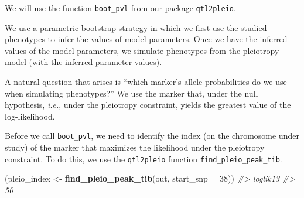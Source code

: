 \documentclass[oneside]{book}\usepackage[]{graphicx}\usepackage[]{color}
\newenvironment{Shaded}{\begin{snugshade}}{\end{snugshade}}
\newcommand{\CommentTok}[1]{\textcolor[rgb]{0.56,0.35,0.01}{\textit{#1}}}
\newcommand{\DataTypeTok}[1]{\textcolor[rgb]{0.13,0.29,0.53}{#1}}
\newcommand{\DecValTok}[1]{\textcolor[rgb]{0.00,0.00,0.81}{#1}}
\newcommand{\KeywordTok}[1]{\textcolor[rgb]{0.13,0.29,0.53}{\textbf{#1}}}
\newcommand{\NormalTok}[1]{#1}
\newcommand{\StringTok}[1]{\textcolor[rgb]{0.31,0.60,0.02}{#1}}
\begin{document}
We will use the function \texttt{boot\_pvl} from our package
\texttt{qtl2pleio}.

We use a parametric bootstrap strategy in which we first use the studied
phenotypes to infer the values of model parameters. Once we have the
inferred values of the model parameters, we simulate phenotypes from the
pleiotropy model (with the inferred parameter values).

A natural question that arises is ``which marker's allele probabilities
do we use when simulating phenotypes?'' We use the marker that, under
the null hypothesis, \emph{i.e.}, under the pleiotropy constraint,
yields the greatest value of the log-likelihood.

Before we call \texttt{boot\_pvl}, we need to identify the index (on the
chromosome under study) of the marker that maximizes the likelihood
under the pleiotropy constraint. To do this, we use the
\texttt{qtl2pleio} function \texttt{find\_pleio\_peak\_tib}.

\begin{Shaded}
\begin{Highlighting}[]
\NormalTok{(pleio_index <-}\StringTok{ }\KeywordTok{find_pleio_peak_tib}\NormalTok{(out, }\DataTypeTok{start_snp =} \DecValTok{38}\NormalTok{))}
\CommentTok{#> loglik13 }
\CommentTok{#>       50}
\end{Highlighting}
\end{Shaded}
\end{document}
